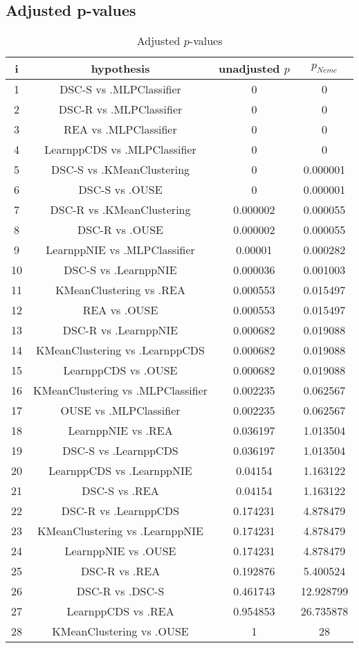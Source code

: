 \documentclass[a4paper,10pt]{article}
\begin{document}
\begin{landscape}
\pagebreak

\subsection{Adjusted p-values}

\begin{table}[!htp]
\centering\scriptsize
\begin{tabular}{cccc}
i&hypothesis&unadjusted $p$&$p_{Neme}$\\
\hline1&DSC-S vs .MLPClassifier&0&0\\
2&DSC-R vs .MLPClassifier&0&0\\
3&REA vs .MLPClassifier&0&0\\
4&LearnppCDS vs .MLPClassifier&0&0\\
5&DSC-S vs .KMeanClustering&0&0.000001\\
6&DSC-S vs .OUSE&0&0.000001\\
7&DSC-R vs .KMeanClustering&0.000002&0.000055\\
8&DSC-R vs .OUSE&0.000002&0.000055\\
9&LearnppNIE vs .MLPClassifier&0.00001&0.000282\\
10&DSC-S vs .LearnppNIE&0.000036&0.001003\\
11&KMeanClustering vs .REA&0.000553&0.015497\\
12&REA vs .OUSE&0.000553&0.015497\\
13&DSC-R vs .LearnppNIE&0.000682&0.019088\\
14&KMeanClustering vs .LearnppCDS&0.000682&0.019088\\
15&LearnppCDS vs .OUSE&0.000682&0.019088\\
16&KMeanClustering vs .MLPClassifier&0.002235&0.062567\\
17&OUSE vs .MLPClassifier&0.002235&0.062567\\
18&LearnppNIE vs .REA&0.036197&1.013504\\
19&DSC-S vs .LearnppCDS&0.036197&1.013504\\
20&LearnppCDS vs .LearnppNIE&0.04154&1.163122\\
21&DSC-S vs .REA&0.04154&1.163122\\
22&DSC-R vs .LearnppCDS&0.174231&4.878479\\
23&KMeanClustering vs .LearnppNIE&0.174231&4.878479\\
24&LearnppNIE vs .OUSE&0.174231&4.878479\\
25&DSC-R vs .REA&0.192876&5.400524\\
26&DSC-R vs .DSC-S&0.461743&12.928799\\
27&LearnppCDS vs .REA&0.954853&26.735878\\
28&KMeanClustering vs .OUSE&1&28\\
\hline
\end{tabular}
\caption{Adjusted $p$-values}
\end{table}

\end{landscape}
\end{document}
